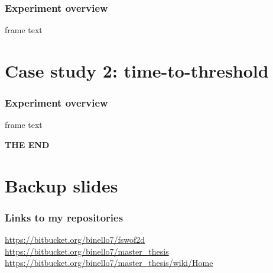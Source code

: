 \documentclass[xcolor=dvipsnames, USenglish]{beamer}  %
\begin{document}
  \begin{frame}
    \frametitle{Experiment overview}
    frame text
  \end{frame}






\section{Case study 2: time-to-threshold}

\begin{frame}
  \frametitle{Experiment overview}
  frame text
\end{frame}



  {
  \begin{frame}[plain]
    \centering
    \Large{\textbf{THE END}}\\
  \end{frame}
  }

\section{Backup slides}
  \begin{frame}
    \frametitle{Links to my repositories}
    \small{\url{https://bitbucket.org/binello7/fswof2d}}\\
    \small{\url{https://bitbucket.org/binello7/master_thesis}}\\
    \small{\url{https://bitbucket.org/binello7/master_thesis/wiki/Home}}
  \end{frame}
\end{document}

